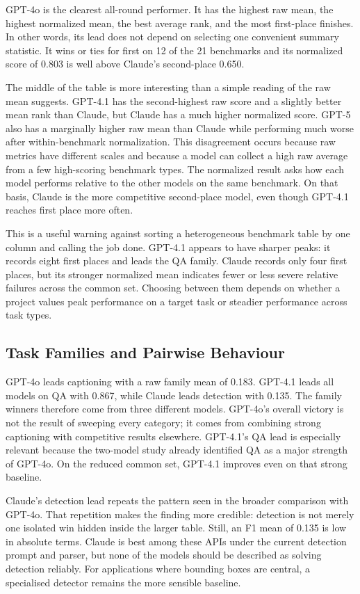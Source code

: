 ﻿\documentclass[11pt,a4paper]{article}
\begin{document}
GPT-4o is the clearest all-round performer. It has the highest raw mean, the
highest normalized mean, the best average rank, and the most first-place
finishes. In other words, its lead does not depend on selecting one convenient
summary statistic. It wins or ties for first on 12 of the 21 benchmarks and
its normalized score of 0.803 is well above Claude's second-place 0.650.

The middle of the table is more interesting than a simple reading of the raw
mean suggests. GPT-4.1 has the second-highest raw score and a slightly better
mean rank than Claude, but Claude has a much higher normalized score. GPT-5
also has a marginally higher raw mean than Claude while performing much worse
after within-benchmark normalization. This disagreement occurs because raw
metrics have different scales and because a model can collect a high raw
average from a few high-scoring benchmark types. The normalized result asks
how each model performs relative to the other models on the same benchmark.
On that basis, Claude is the more competitive second-place model, even though
GPT-4.1 reaches first place more often.

This is a useful warning against sorting a heterogeneous benchmark table by
one column and calling the job done. GPT-4.1 appears to have sharper peaks:
it records eight first places and leads the QA family. Claude records only
four first places, but its stronger normalized mean indicates fewer or less
severe relative failures across the common set. Choosing between them depends
on whether a project values peak performance on a target task or steadier
performance across task types.

\subsection{Task Families and Pairwise Behaviour}

GPT-4o leads captioning with a raw family mean of 0.183. GPT-4.1 leads all
models on QA with 0.867, while Claude leads detection with 0.135. The family
winners therefore come from three different models. GPT-4o's overall victory
is not the result of sweeping every category; it comes from combining strong
captioning with competitive results elsewhere. GPT-4.1's QA lead is
especially relevant because the two-model study already identified QA as a
major strength of GPT-4o. On the reduced common set, GPT-4.1 improves even on
that strong baseline.

Claude's detection lead repeats the pattern seen in the broader comparison
with GPT-4o. That repetition makes the finding more credible: detection is
not merely one isolated win hidden inside the larger table. Still, an F1 mean
of 0.135 is low in absolute terms. Claude is best among these APIs under the
current detection prompt and parser, but none of the models should be
described as solving detection reliably. For applications where bounding
boxes are central, a specialised detector remains the more sensible
baseline.
\end{document}
